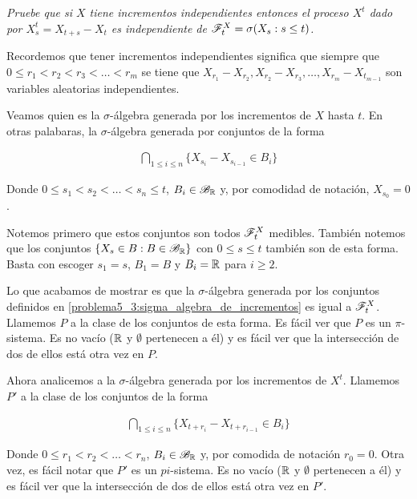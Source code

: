 \emph{
	Pruebe que si $X$ tiene incrementos independientes entonces el proceso $X^t$ dado por $X^t_s=X_{t+s}-X_t$ 
	es independiente de $\mathscr{F}^X_t=\sigma\!\left( X_s : s \leq t\right) $.
}

\afterstatement\pn

Recordemos que tener incrementos independientes significa que siempre que $0 \leq r_1 < r_2 < r_3 < \dots < r_m$ 
se tiene que $X_{r_1} - X_{r_2}, X_{r_2} - X_{r_3}, \dots, X_{r_m} - X_{t_{m-1}}$ son variables aleatorias 
independientes.\pn

Veamos quien es la $\sigma$-álgebra generada por los incrementos de $X$ hasta $t$. En otras palabaras, 
la $\sigma$-álgebra generada por conjuntos de la forma

\begin{align}
    \bigcap_{1 \leq i \leq n} \{ X_{s_i} - X_{s_{i-1}} \in B_i \} \label{problema5_3:sigma_algebra_de_incrementos}
\end{align}\pn

Donde $0 \leq s_1 < s_2 < \dots < s_n \leq t$, $B_i \in \mathscr{B}_{\mathbb{R}}$ y, por comodidad de notación, $X_{s_{0}} = 0$.\pn 

Notemos primero que estos conjuntos son todos $\mathscr{F}_t^X$ medibles. También notemos que los conjuntos 
$\{ X_s \in B : B \in \mathscr{B}_{\mathbb{R}} \}$ con $0 \leq s \leq t$ también son de esta forma. Basta con escoger 
$s_1 = s$, $B_1 = B$ y $B_i = \mathbb{R}$ para $i \geq 2$.\pn

Lo que acabamos de mostrar es que la $\sigma$-álgebra generada por los conjuntos definidos en 
\eqref{problema5_3:sigma_algebra_de_incrementos} es igual a $\mathscr{F}_t^X$. Llamemos $P$ a la clase 
de los conjuntos de esta forma. Es fácil ver que $P$ es un $\pi$-sistema. Es no vacío ($\mathbb{R}$ y $\emptyset$ 
pertenecen a él) y es fácil ver que la intersección de dos de ellos está otra vez en $P$.\pn

Ahora analicemos a la $\sigma$-álgebra generada por los incrementos de $X^t$. Llamemos $P'$ a
la clase de los conjuntos de la forma

\begin{align}
    \bigcap_{1 \leq i \leq n} \{  X_{t + r_i} - X_{t + r_{i - 1}} \in B_i \}
\end{align}

Donde $0 \leq r_1 < r_2 < \dots < r_n$,  $B_i \in \mathscr{B}_{\mathbb{R}}$ y, por comodida de notación 
$r_0 = 0$. Otra vez, es fácil notar que $P'$ es un $pi$-sistema. Es no vacío ($\mathbb{R}$ y $\emptyset$ 
pertenecen a él) y es fácil ver que la intersección de dos de ellos está otra vez en $P'$.\pn

